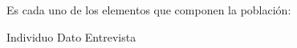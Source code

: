 
\question Es cada uno de los elementos que componen la población:

  \begin{oneparchoices}
    \CorrectChoice Individuo
    \choice Dato
    \choice Entrevista
  \end{oneparchoices}
